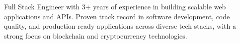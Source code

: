 Full Stack Engineer with 3+ years of experience in building scalable web applications and APIs. Proven track record in software development, code quality, and production-ready applications across diverse tech stacks, with a strong focus on blockchain and cryptocurrency technologies.